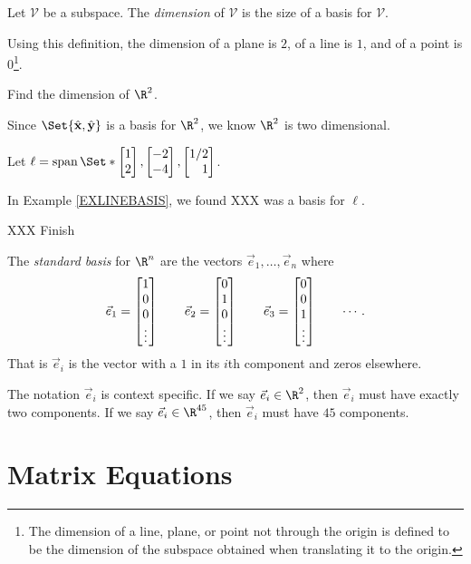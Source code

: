 	\begin{definition}[Dimension]
		Let $\mathcal V$ be a subspace. The \emph{dimension} of $\mathcal V$
		is the size of a basis for $\mathcal V$.
	\end{definition}

	Using this definition, the dimension of a plane is $2$, of a line is $1$,
	and of a point is $0$\footnote{ The dimension of a line, plane, or point
	not through the origin is defined to be the dimension of the subspace obtained
	when translating it to the origin.}.

	\begin{example}
		Find the dimension of $\R^2$.

		Since $\Set{\xhat, \yhat}$ is a basis for $\R^2$, we know $\R^2$ is
		two dimensional.
	\end{example}

	\begin{example}
		Let $\ell=\Span\Set*{\mat{1\\2},\mat{-2\\-4}, \mat{1/2\\1}}$.

		In Example \ref{EXLINEBASIS}, we found XXX was a basis for $\ell$.

		XXX Finish
	\end{example}

	\begin{definition}
		The \emph{standard basis} for $\R^n$ are the 
		vectors $\vec e_1,\ldots,\vec e_n$ where
		\[
			\vec e_1=\begin{bmatrix}1\\0\\0\\\vdots\end{bmatrix}\qquad
			\vec e_2=\begin{bmatrix}0\\1\\0\\\vdots\end{bmatrix}\qquad
			\vec e_3=\begin{bmatrix}0\\0\\1\\\vdots\end{bmatrix}\qquad\cdots.
		\]
		That is $\vec e_i$ is the vector with a $1$ in its
		$i$th component and zeros elsewhere.
	\end{definition}

	The notation $\vec e_i$ is context specific. If we say $\vec e_i\in\R^2$,
	then $\vec e_i$ must have exactly two components. If we say $\vec e_i\in\R^{45}$,
	then $\vec e_i$ must have $45$ components. 

\section{Matrix Equations}
